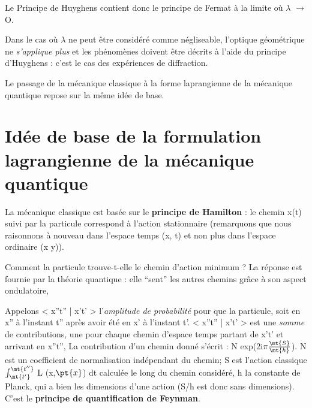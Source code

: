 Le Principe de Huyghens contient donc le principe de Fermat à
la limite où $\lambda$ $\to$ O.

Dans le cas où $\lambda$ ne peut être considéré comme négliseable,
l'optique géométrique ne {\it s'applique plus} et les phénomènes doivent être
décrits à l'aide du principe d'Huyghens : c'est le cas des expériences
de diffraction.

Le passage de la mécanique classique à la forme laprangienne
de la mécanique quantique repose sur la même idée de base.
\section{Idée de base de la formulation lagrangienne de la mécanique quantique}
La mécanique classique est basée sur le {\bf principe de Hamilton} :
le chemin x(t) suivi par la particule correspond à l'action stationnaire
(remarquons que nous raisonnons à nouveau dans l'espace temps (x, t) et
non plus dans l'espace ordinaire (x y)).

\begin{center}  \end{center}
Comment la particule trouve-t-elle le chemin d'action minimum ?
La réponse est fournie par la théorie quantique : elle “sent” les autres
chemins grâce à son aspect ondulatoire,

Appelons < x''t'' | x't' > l'{\it amplitude de probabilité} pour que la
particule, soit en x'' à l'instant t'' après avoir été en x' à l'instant t'.
< x''t'' | x't' > est une {\it somme} de contributions, une pour chaque chemin
d'espace temps partant de x't' et arrivant en x''t'', La contribution d'un
chemin donné s'écrit : N exp(2i$\pi \frac{\mt{S}}{\mt{h}}$). N est un coefficient de normalisation
indépendant du chemin; S est l'action classique $\int_\mt{t'}^\mt{t''}$ L (x,$\pt{x}$) dt calculée
le long du chemin considéré, h la constante de Planck, qui a bien les
dimensions d'une action (S/h est donc sans dimensions). C'est le {\bf principe
de quantification de Feynman}.


